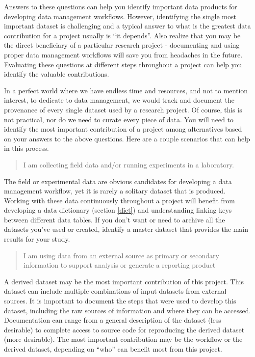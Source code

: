 \documentclass[
]{book}
\begin{document}
Answers to these questions can help you identify important data products for developing data management workflows. However, identifying the single most important dataset is challenging and a typical answer to what is the greatest data contribution for a project usually is ``it depends''. Also realize that you may be the direct beneficiary of a particular research project - documenting and using proper data management workflows will save you from headaches in the future. Evaluating these questions at different steps throughout a project can help you identify the valuable contributions.

In a perfect world where we have endless time and resources, and not to mention interest, to dedicate to data management, we would track and document the provenance of every single dataset used by a research project. Of course, this is not practical, nor do we need to curate every piece of data. You will need to identify the most important contribution of a project among alternatives based on your answers to the above questions. Here are a couple scenarios that can help in this process.

\begin{quote}
I am collecting field data and/or running experiments in a laboratory.
\end{quote}

The field or experimental data are obvious candidates for developing a data management workflow, yet it is rarely a solitary dataset that is produced. Working with these data continuously throughout a project will benefit from developing a data dictionary (section \ref{dict}) and understanding linking keys between different data tables. If you don't want or need to archive all the datasets you've used or created, identify a master dataset that provides the main results for your study.

\begin{quote}
I am using data from an external source as primary or secondary information to support analysis or generate a reporting product
\end{quote}

A derived dataset may be the most important contribution of this project. This dataset can include multiple combinations of input datasets from external sources. It is important to document the steps that were used to develop this dataset, including the raw sources of information and where they can be accessed. Documentation can range from a general description of the dataset (less desirable) to complete access to source code for reproducing the derived dataset (more desirable). The most important contribution may be the workflow or the derived dataset, depending on ``who'' can benefit most from this project.
\end{document}

